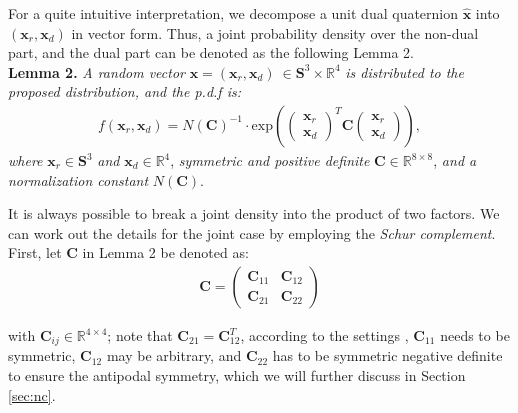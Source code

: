 \documentclass[micromachines,article,accept,pdftex,moreauthors]{Definitions/mdpi}
\begin{document}
For a quite intuitive interpretation, we decompose a unit dual quaternion $\widehat{\boldsymbol{x}}$ into  $(\boldsymbol{x}_{r}, \boldsymbol{x}_{d})$ in vector form. Thus, a joint probability density over the non-dual part, and the dual part can be denoted as the following Lemma 2.\\

\noindent\textbf{Lemma 2.} \textit{A random vector} $\boldsymbol{x} = (\boldsymbol{x}_{r}, \boldsymbol{x}_{d}) {\ }\in \mathbf{S}^{3} \times \mathbb{R}^4 $ \textit{is distributed to the proposed distribution, and the p.d.f is:}\\
\begin{align*}
    f(\boldsymbol{x}_{r}, \boldsymbol{x}_{d}) = {N(\boldsymbol{C})}^{-1} \cdot
    \text{exp}\left({
    {\begin{pmatrix} \boldsymbol{x}_{r} \\ \boldsymbol{x}_{d} \end{pmatrix}}^T
    \boldsymbol{C} 
    {\begin{pmatrix} \boldsymbol{x}_{r} \\ \boldsymbol{x}_{d} \end{pmatrix}}
    }\right),
\end{align*}
\textit{where} $\boldsymbol{x}_{r} \in \mathbf{S}^3$ \textit{and} $\boldsymbol{x}_{d} \in \mathbb{R}^4$, \textit{symmetric and positive definite} $\boldsymbol{C} \in \mathbb{R}^{8 \times 8}$,  \textit{and a normalization constant} $N(\boldsymbol{C})$.

\vspace{6pt}%

It is always possible to break a joint density into the product of two factors. We can work out the details for the joint case by employing the \textit{Schur complement}. First, let $\boldsymbol{C}$ in Lemma 2 be denoted as:
\begin{align*}
    \boldsymbol{C} = \begin{pmatrix}
    {\boldsymbol{C}_{11}} & {\boldsymbol{C}_{12}} \\
    {\boldsymbol{C}_{21}} & {\boldsymbol{C}_{22}}
    \end{pmatrix}
\end{align*}

with $\boldsymbol{C}_{ij} \in \mathbb{R}^{4 \times 4}$; note that $\boldsymbol{C}_{21}=\boldsymbol{C}_{12}^T$, according to the settings \cite{gilitschenskiNewProbabilityDistribution2014}, $\boldsymbol{C}_{11}$ needs to be symmetric, $\boldsymbol{C}_{12}$ may be arbitrary, and $\boldsymbol{C}_{22}$ has to be symmetric negative definite to ensure the antipodal symmetry, which we will further discuss in {Section \ref{sec:nc}}.\\
\end{document}
